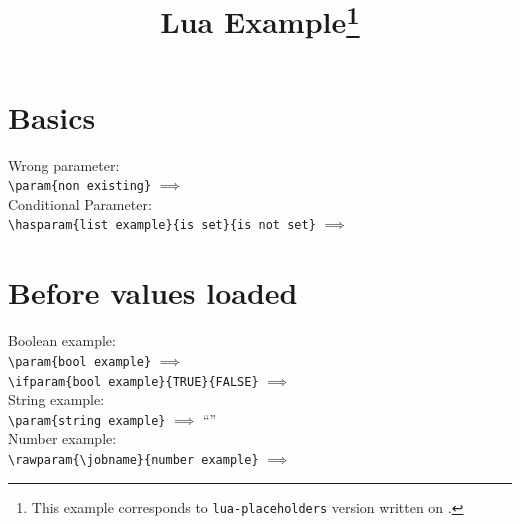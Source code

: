 \documentclass{article}
\begin{document}
    \title{Lua  Example\thanks{This example corresponds to \texttt{lua-placeholders} version \gitversion{} written on \gitdate.}}
    \author{\dogitauthors[\\]}
    \maketitle

    \section*{Basics}
    Wrong parameter:\\

    \lstinline[style=TeX,morekeywords={param}]|\param{non existing}|
    $\implies$
    \\

    Conditional Parameter:\\

    \lstinline[style=TeX,morekeywords={hasparam}]|\hasparam{list example}{is set}{is not set}|
    $\implies$

    \section*{Before values loaded}

    Boolean example:\\

    \lstinline[style=TeX,morekeywords={param}]|\param{bool example}|
    $\implies$
    \\

    \lstinline[style=TeX,morekeywords={ifparam}]|\ifparam{bool example}{TRUE}{FALSE}|
    $\implies$
    \\

    String example:\\

    \lstinline[style=TeX,morekeywords={param}]|\param{string example}|
    $\implies$
    ``''\\

    Number example:\\

    \lstinline[style=TeX,morekeywords={rawparam}]|\rawparam{\jobname}{number example}|
    $\implies$
    \\
\end{document}
